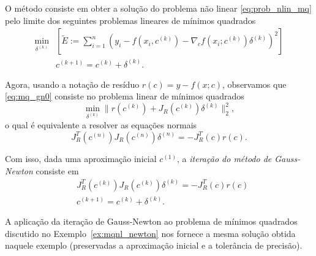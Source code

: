 O método consiste em obter a solução do problema não linear \eqref{eq:prob_nlin_mq} pelo limite dos seguintes problemas lineares de mínimos quadrados
\begin{align}
  \min_{\delta^{(k)}} &\left[\tilde{E} := \sum_{i=1}^n (y_i - f(x_i,c^{(k)}) - \nabla_c f(x_i;c^{(k)})\delta^{(k)})^2\right] \label{eq:mq_gn0}\\
  &c^{(k+1)} = c^{(k)} + \delta^{(k)}.
\end{align}

Agora, usando a notação de resíduo $r(c) = y - f(x;c)$, observamos que \eqref{eq:mq_gn0} consiste no problema linear de mínimos quadrados
\begin{equation}
  \min_{\delta^{(k)}} \|r(c^{(k)}) + J_R(c^{(k)})\delta^{(k)}\|_2^2,
\end{equation}
o qual é equivalente a resolver as equações normais
\begin{equation}
  J_R^T(c^{(n)})J_R(c^{(n)})\delta^{(n)} = -J_R^T(c)r(c).
\end{equation}

Com isso, dada uma aproximação inicial $c^{(1)}$, a \emph{iteração do método de Gauss-Newton} consiste em
\begin{align}
  &J_R^T(c^{(k)})J_R(c^{(k)})\delta^{(k)} = -J_R^T(c)r(c)\\
  &c^{(k+1)} = c^{(k)} + \delta^{(k)}.
\end{align}

\begin{ex}
  A aplicação da iteração de Gauss-Newton ao problema de mínimos quadrados discutido no Exemplo~\ref{ex:mqnl_newton} nos fornece a mesma solução obtida naquele exemplo (preservadas a aproximação inicial e a tolerância de precisão).






\end{ex}

